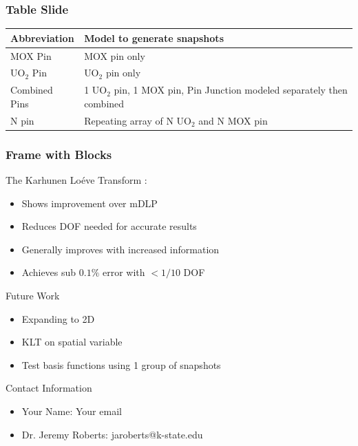 \documentclass[fleqn]{beamer}
\begin{document}
    \begin{frame}
        \frametitle{Table Slide}
        \begin{table}
            \begin{tabular}{l | p{7cm}}\toprule
                Abbreviation    & Model to generate snapshots \\ 
                \hline
                MOX Pin         & MOX pin only \\
                UO$_2$ Pin      & UO$_2$ pin only \\
                Combined Pins  & 1 UO$_2$ pin, 1 MOX pin, Pin Junction modeled separately then combined \\
                N pin           & Repeating array of N UO$_2$ and N MOX pin \\
                \bottomrule
            \end{tabular}
            \label{tab:snapshots}
        \end{table}
    \end{frame}
    
    \begin{frame}
        \frametitle{Frame with Blocks}
        \begin{block}{The Karhunen Lo\'{e}ve Transform :}
            \begin{itemize}
                \item Shows improvement over mDLP
                \item Reduces DOF needed for accurate results
                \item Generally improves with increased information
                \item Achieves sub $0.1\%$ error with $<1/10$ DOF
            \end{itemize}
        \end{block}
        \begin{block}{Future Work}
            \begin{itemize}
                \item Expanding to 2D
                \item KLT on spatial variable
                \item Test basis functions using 1 group of snapshots
            \end{itemize}
        \end{block}
        \begin{block}{Contact Information}
            \begin{itemize}
                \item Your Name: Your email
                \item Dr. Jeremy Roberts: jaroberts@k-state.edu
            \end{itemize}
        \end{block}
        
        \nocite{*}
    \end{frame}
    
\end{document}
